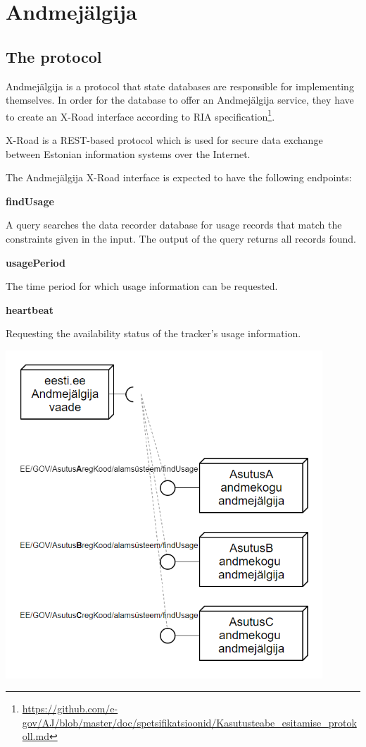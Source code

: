 \section{Andmejälgija} \label{Andmejälgija}

\subsection{The protocol} \label{protocol_desc}

Andmejälgija is a protocol that state databases are responsible for implementing themselves. In order for the database to offer an Andmejälgija service, they have to create an X-Road interface according to RIA specification\footnote{\url{https://github.com/e-gov/AJ/blob/master/doc/spetsifikatsioonid/Kasutusteabe_esitamise_protokoll.md}}. 

X-Road is a REST-based protocol which is used for secure data exchange between Estonian information systems over the Internet.

The Andmejälgija X-Road interface is expected to have the following endpoints:

\textbf{findUsage}

A query searches the data recorder database for usage records that match the constraints given in the input. The output of the query returns all records found.\cite{aj-github-spec}

\textbf{usagePeriod}

The time period for which usage information can be requested.\cite{aj-github-spec}

\textbf{heartbeat}

Requesting the availability status of the tracker's usage information.\cite{aj-github-spec}


\includegraphics[width=450px]{english/figures/aj_model.PNG}


